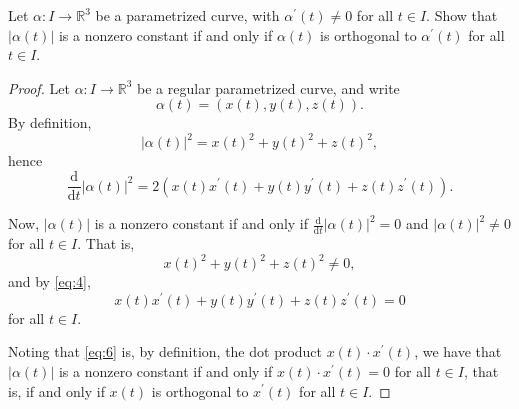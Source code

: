 \documentclass[12pt]{article}
\newenvironment{problem}[2][Problem]{\begin{trivlist}
    \item[\hskip \labelsep {\bfseries #1}\hskip \labelsep {\bfseries #2.}]}{\end{trivlist}}
\theoremstyle{definition}
\begin{document}
\begin{problem}{1.2.5}
	Let \(\alpha: I \rightarrow \mathbb{R}^3\) be a parametrized curve, with \(\alpha^{\prime}(t)\neq 0\) for all \( t \in I \). Show that \( \left| \alpha(t) \right| \) is a nonzero constant if and only if \(\alpha(t)\) is orthogonal to \(\alpha^{\prime}(t)\) for all \( t \in I \).
\end{problem}
\begin{proof}
	Let \(\alpha: I \rightarrow \mathbb{R}^3\) be a regular parametrized curve, and write
	\begin{equation}
		\label{eq:3}
		\alpha(t) = (x(t), y(t), z(t)).
	\end{equation}
	By definition,
	\begin{equation}
		\label{eq:2}
		\left| \alpha(t) \right|^2 = x(t)^2 + y(t)^2 + z(t)^2,
	\end{equation}
	hence
	\begin{equation}
		\label{eq:4}
		\frac{\mathrm{d} }{\mathrm{d} t}\left| \alpha(t) \right|^2 = 2(x(t)x^{\prime}(t) + y(t)y^{\prime}(t) + z(t)z^{\prime}(t)).
	\end{equation}

	Now, \( \left| \alpha(t) \right| \) is a nonzero constant if and only if \( \frac{\mathrm{d} }{\mathrm{d} t}\left| \alpha(t) \right|^2 = 0\) and \( \left| \alpha(t) \right|^2 \neq 0\) for all \( t \in I \).
	That is,
	\begin{equation}
		\label{eq:5}
		x(t)^2 + y(t)^2 + z(t)^2 \neq 0,
	\end{equation}
	and by \cref{eq:4},
	\begin{equation}
		\label{eq:6}
		x(t)x^{\prime}(t) + y(t)y^{\prime}(t) + z(t)z^{\prime}(t) = 0
	\end{equation}
	for all \( t \in I \).

	Noting that \cref{eq:6} is, by definition, the dot product \(x(t) \cdot x^{\prime}(t)\), we have that \( \left| \alpha(t) \right| \) is a nonzero constant if and only if \( x(t) \cdot x^{\prime}(t) = 0 \) for all \( t \in I \), that is, if and only if \( x(t) \) is orthogonal to \( x^{\prime}(t) \) for all \( t \in I \).
\end{proof}
\end{document}
